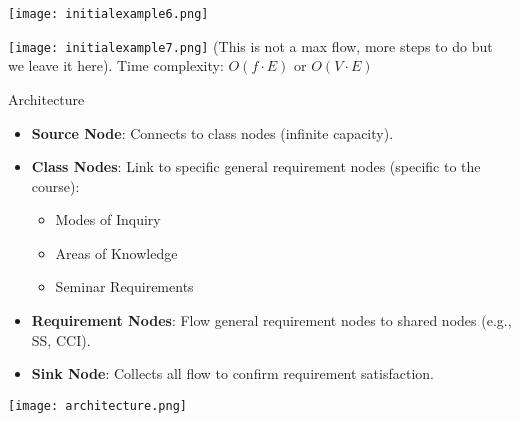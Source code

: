 \documentclass{beamer}
\begin{document}
\begin{frame}
    \centering
    \texttt{[image: initialexample6.png]}
\end{frame}

\begin{frame}
    \centering
    \texttt{[image: initialexample7.png]}
    \tiny (This is not a max flow, more steps to do but we leave it here). Time complexity: $O(f \cdot E)$ or $O(V \cdot E)$
\end{frame}

\begin{frame}{Architecture}
    \begin{itemize}
        \item \textbf{Source Node}: Connects to class nodes (infinite capacity).
        \item \textbf{Class Nodes}: Link to specific general requirement nodes (specific to the course):
        \begin{itemize}
            \item Modes of Inquiry
            \item Areas of Knowledge
            \item Seminar Requirements
        \end{itemize}
        \item \textbf{Requirement Nodes}: Flow general requirement nodes to shared nodes (e.g., SS, CCI).
        \item \textbf{Sink Node}: Collects all flow to confirm requirement satisfaction.
    \end{itemize}
\end{frame}

\begin{frame}
    \centering
    \texttt{[image: architecture.png]}
\end{frame}
\end{document}
